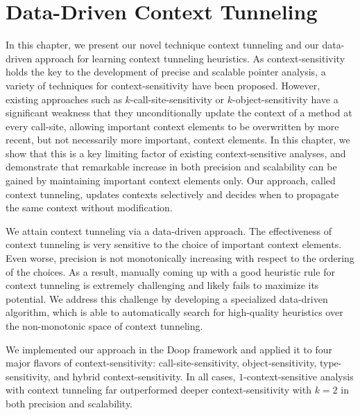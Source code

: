 \chapter{Data-Driven Context Tunneling}\label{sec:Tunneling}
  In this chapter, we present our novel technique context tunneling and our data-driven approach for learning context tunneling heuristics.
  As context-sensitivity holds the key to the development
  of precise and scalable pointer analysis, a variety of techniques
  for context-sensitivity have been proposed. However, existing
  approaches such as $k$-call-site-sensitivity or $k$-object-sensitivity have a
  significant weakness that they unconditionally update the context of a
  method at every call-site, allowing important context elements to be
  overwritten by more recent, but not necessarily more important,
  context elements. In this chapter, we show that this is a key limiting factor of
  existing context-sensitive analyses, and demonstrate that remarkable increase in
  both precision and scalability can be gained by
  maintaining important context elements only.
  Our approach, called context tunneling, updates contexts selectively
  and decides when to propagate the same context without
  modification.



  We attain context tunneling via a data-driven approach.  The
  effectiveness of context tunneling is very sensitive to the choice
  of important context elements. Even worse, precision is not
  monotonically increasing with respect to the ordering of the
  choices. As a result, manually coming up with a good heuristic rule
  for context tunneling is extremely challenging and likely fails to
  maximize its potential. We address this challenge by developing a
  specialized data-driven algorithm, which is able to automatically
  search for high-quality heuristics over the non-monotonic space of
  context tunneling.

  We implemented our approach in the Doop framework and applied it to
  four major flavors of context-sensitivity: call-site-sensitivity,
  object-sensitivity, type-sensitivity, and hybrid context-sensitivity. In
  all cases, $1$-context-sensitive analysis with context
  tunneling far outperformed deeper context-sensitivity with $k=2$ in
  both precision and scalability.






